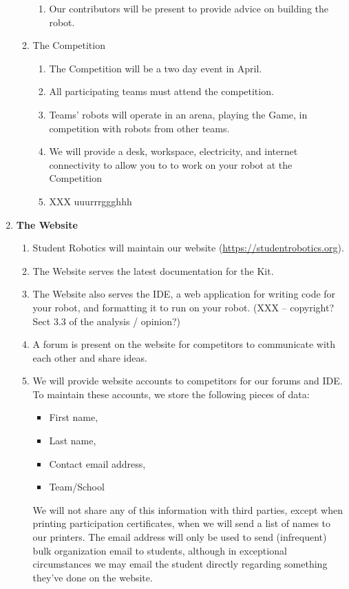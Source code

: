 \documentclass[a4paper, 11pt]{scrartcl}
\begin{document}
\begin{enumerate}
\begin{enumerate}
\begin{enumerate}
\item Our contributors will be present to provide advice on building the robot.
\end{enumerate}

\item The Competition
\begin{enumerate}

\item The Competition will be a two day event in April.

\item All participating teams must attend the competition.

\item Teams' robots will operate in an arena, playing the Game, in competition
with robots from other teams.

\item We will provide a desk, workspace, electricity, and internet connectivity
to allow you to to work on your robot at the Competition

\item XXX uuurrrggghhh

\end{enumerate}
\end{enumerate}

\item \textbf{The Website}
\begin{enumerate}

\item Student Robotics will maintain our website (\url{https://studentrobotics.org}).

\item The Website serves the latest documentation for the Kit.

\item The Website also serves the IDE, a web application for writing code for
your robot, and formatting it to run on your robot. (XXX -- copyright?
Sect 3.3 of the analysis / opinion?)

\item A forum is present on the website for competitors to communicate with
each other and share ideas.

\item We will provide website accounts to competitors for our forums and IDE. To
maintain these accounts, we store the following pieces of data:

\begin{itemize}
\item First name,
\item Last name,
\item Contact email address,
\item Team/School
\end{itemize}
We will not share any of this information with third parties, except when
printing participation certificates, when we will send a list of names to
our printers. The email address will only be used to send (infrequent) bulk
organization email to students, although in exceptional circumstances we
may email the student directly regarding something they've done on the
website.


\end{enumerate}
\end{enumerate}
\end{document}

